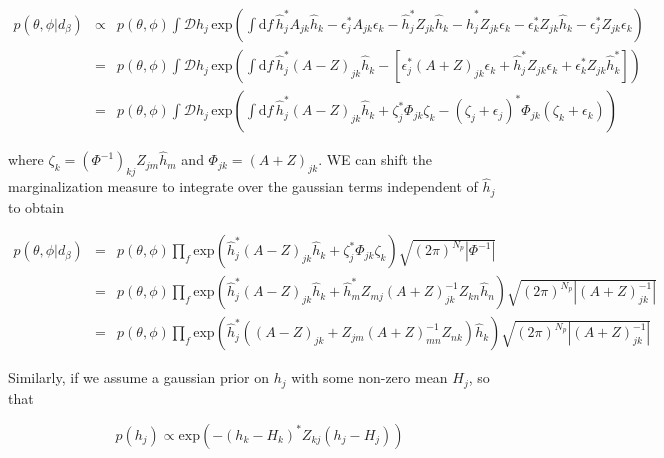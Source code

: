 \documentclass[10pt]{article}
\begin{document}
\begin{eqnarray}
p(\theta, \phi|d_\beta) & \propto & p(\theta,\phi) \int\mathcal{D}h_j\, \mathrm{exp}\left( \int\mathrm{d}f\, \hat{h}_j^\ast A_{jk} \hat{h}_k - \epsilon_j^\ast A_{jk} \epsilon_k - \hat{h}_j^\ast Z_{jk} \hat{h}_k - \hat{h}_j^\ast Z_{jk} \epsilon_k - \epsilon_k^\ast Z_{jk} \hat{h}_k - \epsilon_j^\ast Z_{jk} \epsilon_k \right) \nonumber \\
& = & p(\theta, \phi) \int\mathcal{D}h_j\, \mathrm{exp}\left( \int\mathrm{d}f\, \hat{h}_j^\ast \left(A-Z\right)_{jk} \hat{h}_k - \left[ \epsilon_j^\ast \left(A+Z\right)_{jk}\epsilon_k +\hat{h}_j^\ast Z_{jk} \epsilon_k + \epsilon_k^\ast Z_{jk} \hat{h}_k^\ast \right] \right) \nonumber \\ 
& = & p(\theta, \phi) \int\mathcal{D}h_j\, \mathrm{exp}\left( \int\mathrm{d}f\, \hat{h}_j^\ast \left(A-Z\right)_{jk} \hat{h}_k + \zeta_j^\ast \Phi_{jk} \zeta_k - \left(\zeta_j + \epsilon_j\right)^\ast \Phi_{jk} \left(\zeta_k + \epsilon_k\right) \right)
\end{eqnarray}

where $\zeta_k = \left(\Phi^{-1}\right)_{kj}Z_{jm}\hat{h}_m$ and $\Phi_{jk} = \left(A+Z\right)_{jk}$. WE can shift the marginalization measure to integrate over the gaussian terms independent of $\hat{h}_j$ to obtain

\begin{eqnarray}
p(\theta, \phi| d_\beta) & = & p(\theta,\phi) \prod\limits_f \mathrm{exp}\left( \hat{h}_j^\ast \left(A-Z\right)_{jk} \hat{h}_k + \zeta_j^\ast \Phi_{jk} \zeta_k \right) \sqrt{(2\pi)^{N_p} \left|\Phi^{-1}\right|} \\
& = & p(\theta,\phi) \prod\limits_f \mathrm{exp}\left( \hat{h}_j^\ast \left(A-Z\right)_{jk} \hat{h}_k + \hat{h}_m^\ast Z_{mj} \left(A+Z\right)^{-1}_{jk} Z_{kn} \hat{h}_n \right) \sqrt{(2\pi)^{N_p} \left|\left(A+Z\right)^{-1}_{jk}\right|} \nonumber \\
& = & p(\theta,\phi) \prod\limits_f \mathrm{exp}\left( \hat{h}_j^\ast \left( \left(A-Z\right)_{jk} + Z_{jm} \left(A+Z\right)^{-1}_{mn} Z_{nk} \right) \hat{h}_k \right) \sqrt{(2\pi)^{N_p} \left|\left(A+Z\right)^{-1}_{jk}\right|}
\end{eqnarray}

Similarly, if we assume a gaussian prior on $h_j$ with some non-zero mean $H_j$, so that

\begin{equation}
p(h_j) \propto \mathrm{exp}\left( -(h_k-H_k)^\ast Z_{kj} (h_j-H_j) \right)
\end{equation}
\end{document}
